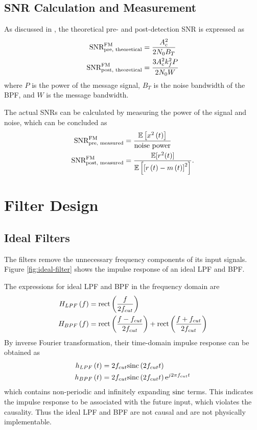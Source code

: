 \documentclass[../ECE459FinalProjectReport.tex]{subfiles}
\begin{document}
\subsection{SNR Calculation and Measurement}
As discussed in \cite[Sec. 9.7]{haykinIntroductionAnalogDigital2007}, the theoretical pre- and post-detection SNR is expressed as
\begin{align}
    \text{SNR}_{\text{pre, theoretical}}^{\text{FM}} &= \frac{A_c^2}{2N_0B_T}\\
    \text{SNR}_{\text{post, theoretical}}^{\text{FM}} &= \frac{3A_c^2 k_f^2 P}{2N_0 W}
\end{align}
where $P$ is the power of the message signal, $B_T$ is the noise bandwidth of the BPF, and $W$ is the message bandwidth. %

The actual SNRs can be calculated by measuring the power of the signal and noise, which can be concluded as
\begin{align}
    \text{SNR}_{\text{pre, measured}}^{\text{FM}} &= \frac{\mathbb{E}\left[x^2\left(t\right)\right]}{\text{noise power}}\\
    \text{SNR}_{\text{post, measured}}^{\text{FM}} &= \frac{\mathbb{E}[r^2(t)]}{\mathbb{E}\left[ \left[ r\left(t\right) - m\left(t\right) \right]^2 \right]}.
\end{align}

\section{Filter Design}
\subsection{Ideal Filters}
The filters remove the unnecessary frequency components of its input signals. Figure \ref{fig:ideal-filter} shows the impulse response of an ideal LPF and BPF.

The expressions for ideal LPF and BPF in the frequency domain are
\begin{align}
    H_{LPF}\left(f\right) &= \text{rect}\left( \frac{f}{2f_{cut}} \right) \\
    H_{BPF}\left(f\right) &= \text{rect}\left( \frac{f-f_{cut}}{2f_{cut}} \right) + \text{rect}\left( \frac{f+f_{cut}}{2f_{cut}} \right)
\end{align}
By inverse Fourier transformation, their time-domain impulse response can be obtained as
\begin{align}
    h_{LPF}\left(t\right) &= 2f_{cut}\text{sinc}\left(2f_{cut} t\right) \\
    h_{BPF}\left(t\right) &= 2f_{cut}\text{sinc}\left(2f_{cut} t\right)\mathrm{e}^{j2\pi f_{cut} t}
\end{align}
which contains non-periodic and infinitely expanding $\text{sinc}$ terms. This indicates the impulse response to be associated with the future input, which violates the causality. Thus the ideal LPF and BPF are not causal and are not physically implementable.
\end{document}
